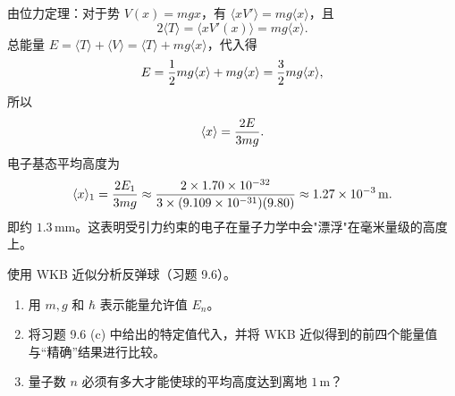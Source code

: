 \begin{solution}
由位力定理：对于势 $V(x)=mgx$，有 $\langle xV'\rangle=mg\langle x\rangle$，且
\[
2\langle T\rangle=\langle xV'(x)\rangle=mg\langle x\rangle.
\]
总能量 $E=\langle T\rangle+\langle V\rangle=\langle T\rangle+mg\langle x\rangle$，代入得
\[
E={1\over2}mg\langle x\rangle+mg\langle x\rangle={3\over2}mg\langle x\rangle,
\]
所以
\[
\langle x\rangle={2E\over3mg}.
\]
电子基态平均高度为
\[
\langle x\rangle_1={2E_1\over3mg}
\approx{2\times1.70\times10^{-32}\over3\times(9.109\times10^{-31})(9.80)}
\approx 1.27\times10^{-3}\,\mathrm{m}.
\]
即约 $1.3\,\mathrm{mm}$。这表明受引力约束的电子在量子力学中会"漂浮"在毫米量级的高度上。
\end{solution}

\begin{question}
使用 WKB 近似分析反弹球（习题 9.6）。
\begin{enumerate}
\item 用 $m,g$ 和 $\hbar$ 表示能量允许值 $E_n$。
\item 将习题 9.6 (c) 中给出的特定值代入，并将 WKB 近似得到的前四个能量值与“精确”结果进行比较。
\item 量子数 $n$ 必须有多大才能使球的平均高度达到离地 $1\,\mathrm{m}$？
\end{enumerate}
\end{question}
